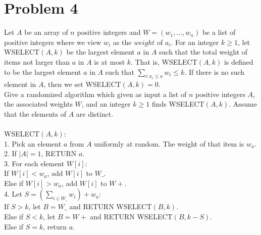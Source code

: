 \documentclass[10pt,letterpaper]{article}
\newcommand\tab[1][0.5cm]{\hspace*{#1}}
\begin{document}
\section{Problem 4}
Let $A$ be an array of $n$ positive integers and $W=(w_1,\dots,w_n)$ be a list of positive integers where we view $w_i$ as the $weight$ of $a_i$. For an integer $k \geq 1$, let WSELECT$(A,k)$ be the largest element $a$ in $A$ such that the total weight of items not larger than $a$ in $A$ is at most $k$. That is, WSELECT$(A,k)$ is defined to be the largest element $a$ in $A$ such that $\sum_{i:a_i \leq a}w_i \leq k$. If there is no such element in $A$, then we set WSELECT$(A,k)=0$.\\
Give a randomized algorithm which given as input a list of $n$ positive integers $A$, the associated weights $W$, and an integer $k \geq 1$ finds WSELECT$(A,k)$. Assume that the elements of $A$ are distinct.\\\\
WSELECT$(A,k)$:\\
1. Pick an element $a$ from $A$ uniformly at random. The weight of that item is $w_a$.\\
2. If $|A|=1$, RETURN $a$.\\
3. For each element $W[i]$:\\
\tab If $W[i]<w_a$, add $W[i]$ to $W\_$.\\
\tab Else if $W[i]>w_a$, add $W[i]$ to $W+$.\\
4. Let $S = (\sum_{i \in W\_}w_i) + w_a$:\\
\tab If $S > k$, let $B=W\_$ and RETURN WSELECT$(B,k)$.\\
\tab Else if $S < k$, let $B=W+$ and RETURN WSELECT$(B,k-S)$.\\
\tab Else if $S = k$, return $a$.\\

\pagebreak

\end{document}
